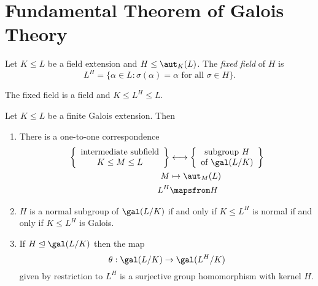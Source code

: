 \documentclass[a4paper]{article}
\begin{document}
\section{Fundamental Theorem of Galois Theory}

\begin{definition}
  Let \(K \leq L\) be a field extension and \(H \leq \aut_K(L)\). The \emph{fixed field} of \(H\) is
  \[
    L^H = \{\alpha \in L: \sigma(\alpha) = \alpha \text{ for all } \sigma \in H \}.
  \]
\end{definition}

The fixed field is a field and \(K \leq L^H \leq L\).

\begin{theorem}
  \label{thm:fundamental}
  Let \(K \leq L\) be a finite Galois extension. Then
  \begin{enumerate}
  \item There is a one-to-one correspondence
    \begin{align*}
      \left\{
        \begin{array}[h]{c}
          \text{intermediate subfield} \\
          K \leq M \leq L
        \end{array}
      \right\}
      &\longleftrightarrow
      \left\{
        \begin{array}[h]{c}
          \text{subgroup } H \\
          \text{of } \gal(L/K)
        \end{array}
      \right\} \\
      M &\mapsto \aut_M(L) \\
      L^H &\mapsfrom H
    \end{align*}
  \item \(H\) is a normal subgroup of \(\gal(L/K)\) if and only if \(K \leq L^H\) is normal if and only if \(K \leq L^H\) is Galois.
  \item If \(H \trianglelefteq \gal(L/K)\) then the map
    \[
      \theta: \gal(L/K) \to \gal(L^H/K)
    \]
    given by restriction to \(L^H\) is a surjective group homomorphism with kernel \(H\).
  \end{enumerate}
\end{theorem}
\end{document}
